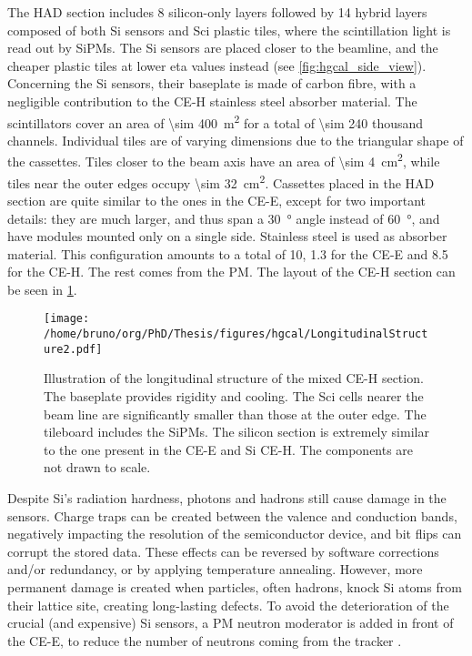 \documentclass[11pt]{article}
\begin{document}
The \ac{HAD} section includes \num{8} silicon-only layers followed by \num{14} hybrid layers composed of both \ac{Si} sensors and \ac{Sci} plastic tiles, where the scintillation light is read out by \acp{SiPM}.
The \ac{Si} sensors are placed closer to the beamline, and the cheaper plastic tiles at lower \ac{eta} values instead (see \cref{fig:hgcal_side_view}).
Concerning the \ac{Si} sensors, their baseplate is made of carbon fibre, with a negligible contribution to the \ac{CE-H} stainless steel absorber material.
The scintillators cover an area of \SI{\sim 400}{\meter\squared} for a total of \num{\sim 240} thousand channels.
Individual tiles are of varying dimensions due to the triangular shape of the cassettes.
Tiles closer to the beam axis have an area of \SI{\sim 4}{\cm\squared}, while tiles near the outer edges occupy \SI{\sim 32}{\cm\squared}.
Cassettes placed in the \ac{HAD} section are quite similar to the ones in the \ac{CE-E}, except for two important details: they are much larger, and thus span a \SI{30}{\degree} angle instead of \SI{60}{\degree}, and have modules mounted only on a single side.
Stainless steel is used as absorber material.
This configuration amounts to a total of \SI{10}{\nucintl}, \SI{1.3}{\nucintl} for the \ac{CE-E} and \SI{8.5}{\nucintl} for the \ac{CE-H}.
The rest comes from the \ac{PM}.
The layout of the \ac{CE-H} section can be seen in \cref{fig:hgcal_long_structure2}.

\begin{figure}
\texttt{[image: /home/bruno/org/PhD/Thesis/figures/hgcal/LongitudinalStructure2.pdf]}
\caption{\label{fig:hgcal_long_structure2}Illustration of the longitudinal structure of the mixed \ac{CE-H} section. The  baseplate provides rigidity and cooling. The \ac{Sci} cells nearer the beam line are significantly smaller than those at the outer edge. The tileboard includes the \acp{SiPM}. The silicon section is extremely similar to the one present in the \ac{CE-E} and \ac{Si} \ac{CE-H}. The components are not drawn to scale.}
\end{figure}

Despite \ac{Si}'s radiation hardness, photons and hadrons still cause damage in the sensors.
Charge traps can be created between the valence and conduction bands, negatively impacting the resolution of the semiconductor device, and bit flips can corrupt the stored data.
These effects can be reversed by software corrections and/or redundancy, or by applying temperature annealing.
However, more permanent damage is created when particles, often hadrons, knock \ac{Si} atoms from their lattice site, creating long-lasting defects.
To avoid the deterioration of the crucial (and expensive) \ac{Si} sensors, a \ac{PM} neutron moderator is added in front of the \ac{CE-E}, to reduce the number of neutrons coming from the tracker \cite{calorimetry_fabjan,radiation_damage_silicon2,radiation_damage_silicon}.
\end{document}
